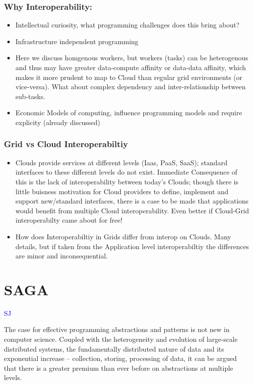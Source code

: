 \documentclass[conference,final]{IEEEtran}
\begin{document}
\subsubsection*{Why Interoperability:}
\begin{itemize}
\item Intellectual curiosity, what programming challenges does this 
  bring about?
\item Infrastructure independent programming
\item Here we discuss homgenous workers, but workers (tasks) can be
  heterogenous and thus may have greater data-compute affinity or
  data-data affinity, which makes it more prudent to map to Cloud than
  regular grid environments (or vice-versa). What about complex
  dependency and inter-relationship between sub-tasks.

\item Economic Models of computing, influence programming models and require
explicity  (already discussed)
\end{itemize}

\subsubsection*{Grid vs Cloud Interoperabiltiy}

\begin{itemize}
\item Clouds provide services at different levels (Iaas, PaaS, SaaS);
  standard interfaces to these different levels do not
  exist. Immediate Consequence of this is the lack of interoperability
  between today's Clouds; though there is little buisness motivation
  for Cloud providers to define, implement and support new/standard
  interfaces, there is a case to be made that applications would
  benefit from multiple Cloud interoperability.  Even better if
  Cloud-Grid interoperabilty came about for free!

\item How does Interoperabiltiy in Grids differ from interop on
  Clouds.  Many details, but if taken from the Application level
  interoperabiltiy the differences are minor and inconsequential.
\end{itemize}


\section{SAGA}  {\textcolor{blue} {SJ}}


The case for effective programming abstractions and patterns is not
new in computer science.  Coupled with the heterogeneity and evolution
of large-scale distributed systems, the fundamentally distributed
nature of data and its exponential increase -- collection, storing,
processing of data, it can be argued that there is a greater premium
than ever before on abstractions at multiple levels.
\end{document}
